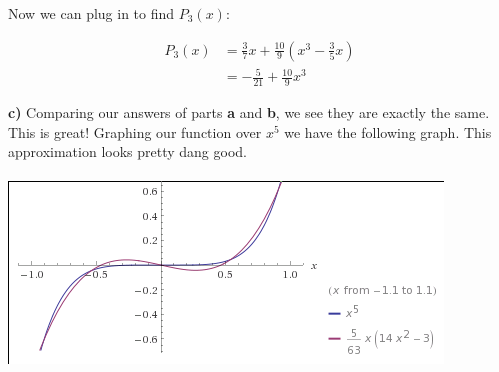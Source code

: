 \documentclass{scrartcl}
\begin{document}
Now we can plug in to find $P_3(x)$:

\begin{align*}
P_3(x)&=\frac{3}{7}x+\frac{10}{9}(x^3-\frac{3}{5}x)\\
&=-\frac{5}{21}+\frac{10}{9}x^3
\end{align*}\pagebreak

\textbf{c)} Comparing our answers of parts \textbf{a} and \textbf{b}, we see they are exactly the same. This is great! Graphing our function over $x^5$ we have the following graph. This approximation looks pretty dang good.\\\\

\includegraphics{InterpolationOfx^5.png}
\end{document}
